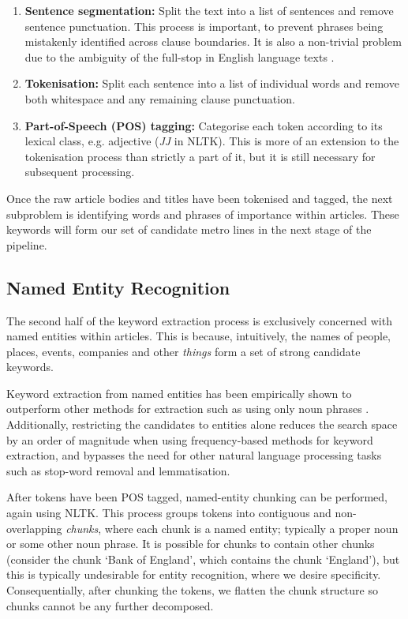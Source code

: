 \begin{enumerate}[itemsep=0.3em]
	\item\textbf{Sentence segmentation:} Split the text into a list of sentences and remove sentence punctuation. This process is important, to prevent phrases being mistakenly identified across clause boundaries. It is also a non-trivial problem due to the ambiguity of the full-stop in English language texts \citep{TokenisationAndSentenceSegmentation}.
	\item\textbf{Tokenisation:} Split each sentence into a list of individual words and remove both whitespace and any remaining clause punctuation.
	\item\textbf{Part-of-Speech (POS) tagging:} Categorise each token according to its lexical class, e.g. adjective (\textit{JJ} in NLTK). This is more of an extension to the tokenisation process than strictly a part of it, but it is still necessary for subsequent processing.
\end{enumerate}

Once the raw article bodies and titles have been tokenised and tagged, the next subproblem is identifying words and phrases of importance within articles. These keywords will form our set of candidate metro lines in the next stage of the pipeline.

\subsection{Named Entity Recognition}

The second half of the keyword extraction process is exclusively concerned with named entities within articles. This is because, intuitively, the names of people, places, events, companies and other \textit{things} form a set of strong candidate keywords. 

Keyword extraction from named entities has been empirically shown to outperform other methods for extraction such as using only noun phrases \citep{EventTracking}. Additionally, restricting the candidates to entities alone reduces the search space by an order of magnitude when using frequency-based methods for keyword extraction, and bypasses the need for other natural language processing tasks such as stop-word removal and lemmatisation.

After tokens have been POS tagged, named-entity chunking can be performed, again using NLTK. This process groups tokens into contiguous and non-overlapping \textit{chunks}, where each chunk is a named entity; typically a proper noun or some other noun phrase. It is possible for chunks to contain other chunks (consider the chunk `Bank of England', which contains the chunk `England'), but this is typically undesirable for entity recognition, where we desire specificity. Consequentially, after chunking the tokens, we flatten the chunk structure so chunks cannot be any further decomposed.

